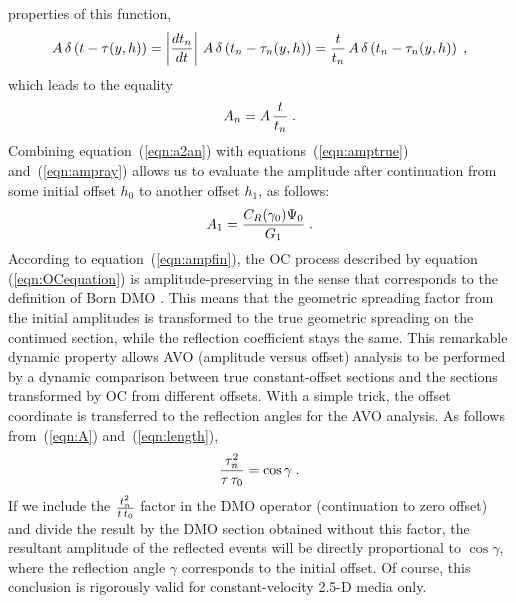 properties of this function,
\begin{equation}
A\,\delta\left(t-\tau(y,h)\right)=\left|{{dt_n} \over {dt}}\right|\,
A\,\delta\left(t_n-\tau_n(y,h)\right) =
{t \over t_n}\,A\,\delta\left(t_n-\tau_n(y,h)\right)\;, 
\label{eqn:deltafun} 
\end{equation}
which leads to the equality
\begin{equation}
A_n=A\,{t \over t_n}\;.
\label{eqn:a2an} 
\end{equation}
Combining equation~(\ref{eqn:a2an}) with equations~(\ref{eqn:amptrue})
and~(\ref{eqn:ampray}) allows us to evaluate the amplitude after
continuation from some initial offset $h_0$ to another offset $h_1$,
as follows:
\begin{equation}
A_1={{C_R(\gamma_0) \Psi_0}\over G_1}\;.
\label{eqn:ampfin}
\end{equation}
According to equation~(\ref{eqn:ampfin}), the OC process described by
equation (\ref{eqn:OCequation}) is amplitude-preserving in the sense
that corresponds to the definition of Born DMO
\cite[]{born,GEO56-02-01820189}. This means that the geometric spreading
factor from the initial amplitudes is transformed to the true
geometric spreading on the continued section, while the reflection
coefficient stays the same. This remarkable dynamic property allows
AVO (amplitude versus offset) analysis to be performed by a dynamic
comparison between true constant-offset sections and the sections
transformed by OC from different offsets.  With a simple trick, the
offset coordinate is transferred to the reflection angles for the AVO
analysis.  As follows from~(\ref{eqn:A}) and~(\ref{eqn:length}),
\begin{equation}
{\tau_n^2 \over \tau\,\tau_0}=\cos{\gamma}\;.
\label{eqn:AVO}
\end{equation}
If we include the ${t_n^2 \over t\,t_0}$ factor in the DMO operator
(continuation to zero offset) and divide the result by the DMO section
obtained without this factor, the resultant amplitude of the reflected
events will be directly proportional to $\cos{\gamma}$, where the
reflection angle $\gamma$ corresponds to the initial offset. Of
course, this conclusion is rigorously valid for constant-velocity
2.5-D media only.

